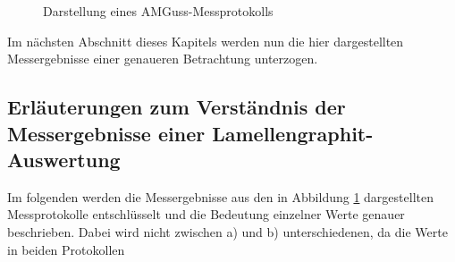 \documentclass[
fontsize=10pt, 
listof = totoc,
parskip = half	
]{report}
\begin{document}
\begin{figure}[H]
	\centering
	\caption{Darstellung eines AMGuss-Messprotokolls}
	\label{fig:LamelloReport}
\end{figure}

\noindent Im nächsten Abschnitt dieses Kapitels werden nun die hier dargestellten Messergebnisse einer genaueren Betrachtung unterzogen.

\subsection{Erläuterungen zum Verständnis der Messergebnisse einer Lamellengraphit-Auswertung}
\label{subsec:ErgebnisseAMGuss}
Im folgenden werden die Messergebnisse aus den in Abbildung \ref{fig:LamelloReport} dargestellten Messprotokolle entschlüsselt und die Bedeutung einzelner Werte genauer beschrieben. Dabei wird nicht zwischen a) und b) unterschiedenen, da die Werte in beiden Protokollen
\end{document}
